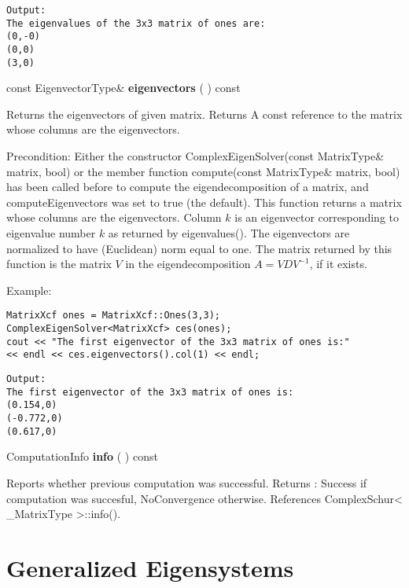 \begin{verbatim}		
Output:
The eigenvalues of the 3x3 matrix of ones are:
(0,-0)
(0,0)
(3,0)
\end{verbatim}



\vspace{0.3cm}
const EigenvectorType\& \textbf{eigenvectors}  ( )  const 

Returns the eigenvectors of given matrix. 
Returns A const reference to the matrix whose columns are the eigenvectors.

Precondition: Either the constructor ComplexEigenSolver(const MatrixType\& matrix, bool) or the member function compute(const MatrixType\& matrix, bool) has been called before to compute the eigendecomposition of a matrix, and computeEigenvectors was set to true (the default).
This function returns a matrix whose columns are the eigenvectors. Column $k$ is an eigenvector corresponding to eigenvalue number $k$ as returned by eigenvalues(). The eigenvectors are normalized to have (Euclidean) norm equal to one. The matrix returned by this function is the matrix $V$ in the eigendecomposition $A=VD V^{-1}$, if it exists.


Example:
\begin{lstlisting}
MatrixXcf ones = MatrixXcf::Ones(3,3);
ComplexEigenSolver<MatrixXcf> ces(ones);
cout << "The first eigenvector of the 3x3 matrix of ones is:"
<< endl << ces.eigenvectors().col(1) << endl;
\end{lstlisting}

\begin{verbatim}		
Output:
The first eigenvector of the 3x3 matrix of ones is:
(0.154,0)
(-0.772,0)
(0.617,0)
\end{verbatim}



\vspace{0.3cm}
ComputationInfo \textbf{info}  ( )  const 

Reports whether previous computation was successful. 
Returns : Success if computation was succesful, NoConvergence otherwise. 
References ComplexSchur< \_MatrixType >::info().






\newpage
\section{Generalized Eigensystems}
\label{Real Generalized Symmetric Eigensystem}

